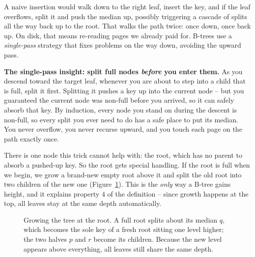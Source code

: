 A naive insertion would walk down to the right leaf, insert
the key, and if the leaf overflows, split it and push the median up, possibly
triggering a cascade of splits all the way back up to the root. That walks the path twice: once down, once back up. On disk, that means
re-reading pages we already paid for. B-trees use a \emph{single-pass}
strategy that fixes problems on the way down, avoiding the upward pass.

\begin{focusbox}
\textbf{The single-pass insight: split full nodes \emph{before} you enter them.}
As you descend toward the target leaf, whenever you are about to step into a child
that is full, split it first. Splitting it pushes a key up into the current node --
but you guaranteed the current node was non-full before you arrived, so it can
safely absorb that key. By induction, every node you stand on during the descent is
non-full, so every split you ever need to do has a safe place to put its median.
You never overflow, you never recurse upward, and you touch each page on the path
exactly once.
\end{focusbox}

There is one node this trick cannot help with: the root, which has no parent to
absorb a pushed-up key. So the root gets special handling. If the root is full when
we begin, we grow a brand-new empty root above it and split the old root into two
children of the new one (Figure~\ref{ch18:fig-rootsplit}). This is the \emph{only}
way a B-tree gains height, and it explains property 4 of the definition -- since
growth happens at the top, all leaves stay at the same depth automatically.

\begin{figure}[H]
\begin{center}
\end{center}
\caption{Growing the tree at the root. A full root splits about its median $q$,
which becomes the sole key of a fresh root sitting one level higher; the two halves
$p$ and $r$ become its children. Because the new level appears above everything,
all leaves still share the same depth.}
\label{ch18:fig-rootsplit}
\end{figure}

